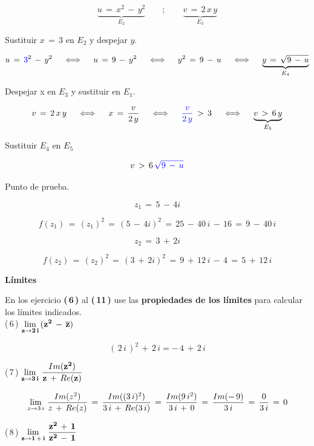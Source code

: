 \documentclass[a4paper,11pt,openany]{book}
\begin{document}
$$\underbrace{u\,=\,x^{2}\,-\,y^{2}}_{E_{2}} \qquad;\qquad \underbrace{v\,=\,2\,x\,y}_{E_{3}}$$

\textcolor{ao(english)}{} Sustituir $x\,=\,3$ en $E_{2}$ y despejar $y$.

$$u\,=\,\textcolor{ao}{3}^{2}\,-\,y^{2} \quad\iff\quad u\,=\,9\,-\,y^{2} \quad\iff\quad y^{2}\,=\,9\,-\,u \quad\iff\quad \underbrace{y\,=\,\sqrt{9\,-\,u}}_{E_{4}}$$

\textcolor{ao(english)}{} Despejar x en $E_{3}$ y sustituir en $E_{1}$.

$$v\,=\,2\,x\,y \quad\iff\quad x\,=\,\dfrac{v}{2\,y} \quad\iff\quad \textcolor{ao}{\dfrac{v}{2\,y}}\,>\,3 \quad\iff\quad \underbrace{v\,>\,6\,y}_{E_{5}}$$

\textcolor{ao(english)}{} Sustituir $E_{4}$ en $E_{5}$

$$v\,>\,6\,\textcolor{ao}{\sqrt{9\,-\,u}}$$

\textcolor{ao(english)}{} Punto de prueba.

$$z_{1}\,=\,5\,-\,4i$$

$$f(z_{1})\,=\,(z_{1})^{2}\,=\,(5\,-\,4i)^{2}\,=\,25\,-\,40\,i\,-\,16\,=\,9\,-\,40\,i$$


$$z_{2}\,=\,3\,+\,2i$$

$$f(z_{2})\,=\,(z_{2})^{2}\,=\,(3\,+\,2i)^{2}\,=\,9\,+\,12\,i\,-\,4\,=\,5\,+\,12\,i$$

\begin{center}
\textbf{Límites}
\end{center}

En los ejercicio \textbf{(\,6\,)} al \textbf{(\,11\,)} use las \textbf{propiedades de los límites} para calcular los límites indicados.\\

\textcolor{ao(english)}{(\,6\,)} $\bf{\displaystyle\lim_{z \to 2\,i}\,(z^{2}\,-\,\overline{z})}$

$$ (\,2\,i\,)^{2}\,+\,2\,i = \boxed{-\,4\,+\,2\,i}$$

\textcolor{ao(english)}{(\,7\,)} $\bf{\displaystyle\lim_{z \to 3\,i}\,\dfrac{\mathnormal{Im}(z^{2})}{z\,+\,\mathnormal{Re}(z)}}$

$$\displaystyle\lim_{z \to 3\,i}\,\dfrac{\mathnormal{Im}(z^{2})}{z\,+\,\mathnormal{Re}(z)}\,=\,\dfrac{\mathnormal{Im}((3\,i)^{2})}{3\,i\,+\,\mathnormal{Re}(3\,i)}\,=\,\dfrac{\mathnormal{Im}(9\,i^{2})}{3\,i\,+\,0}\,=\,\dfrac{\mathnormal{Im}(-\,9)}{3\,i}\,=\,\dfrac{0}{3\,i}\,=\,0$$

\textcolor{ao(english)}{(\,8\,)} $\bf{\displaystyle\lim_{z \to 1\,+\,i}\,\dfrac{z^{2}\,+\,1}{z^{2}\,-\,1}}$
\end{document}
